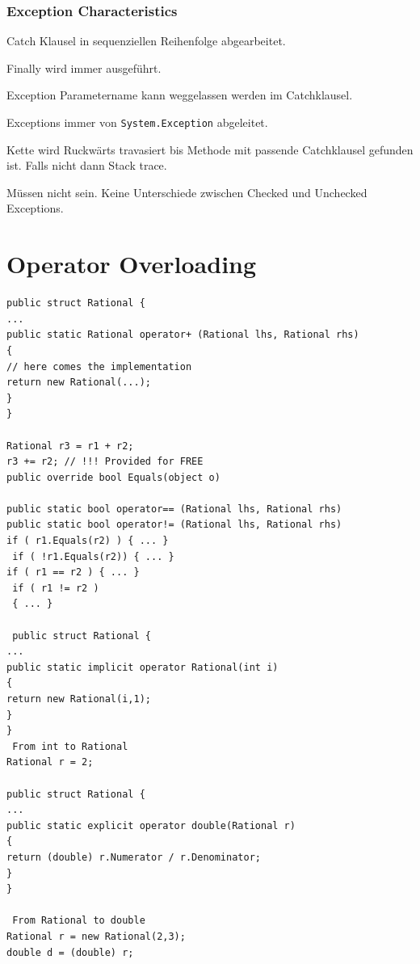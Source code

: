 \documentclass[a4paper,10pt]{scrartcl}
\begin{document}
\subsubsection{Exception Characteristics}
\begin{description}
 \item Catch Klausel in sequenziellen Reihenfolge abgearbeitet.
 \item Finally wird immer ausgeführt.
 \item Exception Parametername kann weggelassen werden im Catchklausel.
 \item Exceptions immer von \texttt{System.Exception} abgeleitet.
 \item[Catchklauselbehandelung] Kette wird Ruckwärts travasiert bis Methode mit passende Catchklausel gefunden ist. Falls nicht dann Stack trace.
 \item [Fangen von Exceptions] Müssen nicht sein. Keine Unterschiede zwischen Checked und Unchecked Exceptions.
\end{description}

\section{Operator Overloading}
\begin{lstlisting}[caption=Operator Overloading Beispiel]
 public struct Rational {
...
public static Rational operator+ (Rational lhs, Rational rhs)
{
// here comes the implementation
return new Rational(...);
}
}

Rational r3 = r1 + r2;
r3 += r2; // !!! Provided for FREE
public override bool Equals(object o)

public static bool operator== (Rational lhs, Rational rhs)
public static bool operator!= (Rational lhs, Rational rhs)
if ( r1.Equals(r2) ) { ... }
 if ( !r1.Equals(r2)) { ... }
if ( r1 == r2 ) { ... }
 if ( r1 != r2 )
 { ... }

 public struct Rational {
...
public static implicit operator Rational(int i)
{
return new Rational(i,1);
}
}
 From int to Rational
Rational r = 2;

public struct Rational {
...
public static explicit operator double(Rational r)
{
return (double) r.Numerator / r.Denominator;
}
}

 From Rational to double
Rational r = new Rational(2,3);
double d = (double) r;

\end{lstlisting}
\end{document}

